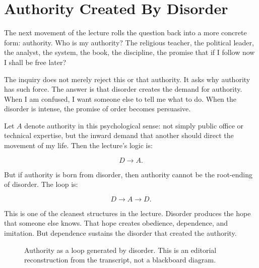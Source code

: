 \section{Authority Created By Disorder}

The next movement of the lecture rolls the question back into a more concrete form: authority. Who is my authority? The religious teacher, the political leader, the analyst, the system, the book, the discipline, the promise that if I follow now I shall be free later?

The inquiry does not merely reject this or that authority. It asks why authority has such force. The answer is that disorder creates the demand for authority. When I am confused, I want someone else to tell me what to do. When the disorder is intense, the promise of order becomes persuasive.

Let \(A\) denote authority in this psychological sense: not simply public office or technical expertise, but the inward demand that another should direct the movement of my life. Then the lecture's logic is:

\begin{equation}
D \longrightarrow A.
\end{equation}

But if authority is born from disorder, then authority cannot be the root-ending of disorder. The loop is:

\begin{equation}
D \longrightarrow A \longrightarrow D.
\end{equation}

This is one of the cleanest structures in the lecture. Disorder produces the hope that someone else knows. That hope creates obedience, dependence, and imitation. But dependence sustains the disorder that created the authority.

\begin{figure}
\centering
{}
\caption{Authority as a loop generated by disorder. This is an editorial reconstruction from the transcript, not a blackboard diagram.}
\end{figure}

